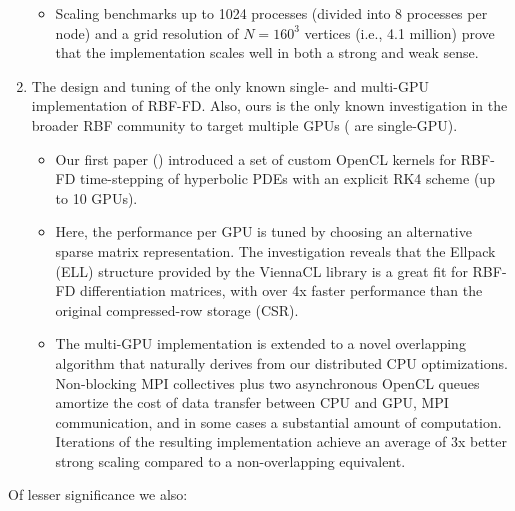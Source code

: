 \begin{enumerate}
\begin{itemize}
\item Scaling benchmarks up to 1024 processes (divided into 8 processes per node) and a grid resolution of $N=160^3$ vertices (i.e., 4.1 million) prove that the implementation scales well in both a strong and weak sense. 
\end{itemize} 
\item The design and tuning of the only known single- and multi-GPU implementation of RBF-FD. Also, ours is the only known investigation in the broader RBF community to target multiple GPUs (\cite{Schmidt2009a,Cuomo2013} are single-GPU). 
\begin{itemize} 
\item Our first paper (\cite{BolligFlyerErlebacher2012}) introduced a set of custom OpenCL kernels for RBF-FD time-stepping of hyperbolic PDEs with an explicit RK4 scheme (up to 10 GPUs). 
\item Here, the performance per GPU is tuned by choosing an alternative sparse matrix representation. The investigation reveals that the Ellpack (ELL) structure provided by the ViennaCL library \cite{Rupp2010} is a great fit for RBF-FD differentiation matrices, with over 4x faster performance than the original compressed-row storage (CSR). %
\item The multi-GPU implementation is extended to a novel overlapping algorithm that naturally derives from our distributed CPU optimizations. Non-blocking MPI collectives plus two asynchronous OpenCL queues amortize the cost of data transfer between CPU and GPU, MPI communication, and in some cases a substantial amount of computation. Iterations of the resulting implementation achieve an average of 3x better strong scaling compared to a non-overlapping equivalent. 
\end{itemize} 
\end{enumerate}
Of lesser significance we also: 
